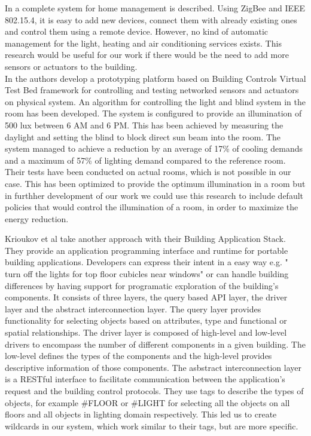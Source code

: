 In \cite{Han10} a complete system for home management is described. Using ZigBee and IEEE 802.15.4, it is easy to add new devices, connect them with already existing ones and control them using a remote device. However, no kind of automatic management for the light, heating and air conditioning services exists. This research would be useful for our work if there would be the need to add more sensors or actuators to the building.
\\In \cite{Wen11} the authors develop a prototyping platform based on Building Controls Virtual Test Bed framework \cite{Bcvtb} for controlling and testing networked sensors and actuators on physical system. An algorithm for controlling the light and blind system in the room has been developed. The system is configured to provide an illumination of 500 lux between 6 AM and 6 PM. This has been achieved by measuring the daylight and setting the blind to block direct sun beam into the room. The system managed to achieve a reduction by an average of 17\% of cooling demands and a maximum of 57\% of lighting demand compared to the reference room. Their tests have been conducted on actual rooms, which is not possible in our case. This has been optimized to provide the optimum illumination in a room but in furthher development of our work we could use this research to include default policies that would control the illumination of a room, in order to maximize the energy reduction. 

Krioukov et al \cite{Krioukov12} take another approach with their Building Application Stack. They provide an application programming interface and runtime for portable building applications. Developers can express their intent in a easy way e.g. " turn off the lights
for top floor cubicles near windows" or can handle building differences by having support for programatic exploration of the building's components. It consists of three layers, the query based API layer, the driver layer and the abstract interconnection layer. 
The query layer provides functionality for selecting objects based on attributes, type and functional or spatial relationships. The driver layer is composed of high-level and low-level drivers to encompass the number of different components in a given building. The low-level defines the types of the components and the high-level provides descriptive information of those components. The asbstract interconnection layer is a RESTful interface to facilitate communication between the application's request and the building control protocols. They use tags to describe the types of objects, for example \#FLOOR or \#LIGHT for selecting all the objects on all floors and all objects in lighting domain respectively. This led us to create wildcards in our system, which work similar to their tags, but are more specific. 

